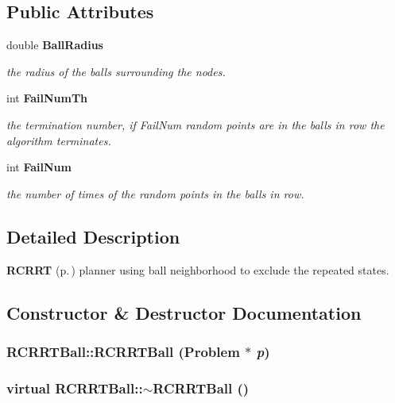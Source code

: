 \subsection*{Public Attributes}
\begin{CompactItemize}
\item 
double {\bf Ball\-Radius}
\begin{CompactList}\small\item\em the radius of the balls surrounding the nodes.\item\end{CompactList}\item 
int {\bf Fail\-Num\-Th}
\begin{CompactList}\small\item\em the termination number, if Fail\-Num random points are in the balls in row the algorithm terminates.\item\end{CompactList}\item 
int {\bf Fail\-Num}
\begin{CompactList}\small\item\em the number of times of the random points in the balls in row.\item\end{CompactList}\end{CompactItemize}


\subsection{Detailed Description}
{\bf RCRRT} {\rm (p.\,\pageref{classRCRRT})} planner using ball neighborhood to exclude the repeated states.



\subsection{Constructor \& Destructor Documentation}
\subsubsection{\setlength{\rightskip}{0pt plus 5cm}RCRRTBall::RCRRTBall ({\bf Problem} $\ast$ {\em p})}\label{classRCRRTBall_a0}


\subsubsection{\setlength{\rightskip}{0pt plus 5cm}virtual RCRRTBall::$\sim$RCRRTBall ()\hspace{0.3cm}{\tt  [inline, virtual]}}\label{classRCRRTBall_a1}




